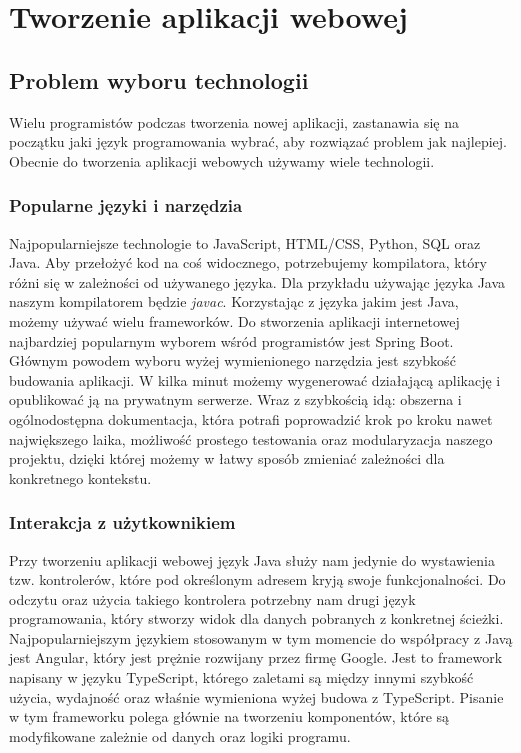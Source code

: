 \chapter{Tworzenie aplikacji webowej}

\section{Problem wyboru technologii}

Wielu programistów podczas tworzenia nowej aplikacji, zastanawia się na początku jaki język programowania wybrać, aby rozwiązać problem jak najlepiej. Obecnie do tworzenia aplikacji webowych używamy wiele technologii.

\subsection{Popularne języki i narzędzia}

Najpopularniejsze technologie to JavaScript, HTML/CSS, Python, SQL oraz Java. Aby przełożyć kod na coś widocznego, potrzebujemy kompilatora, który różni się w zależności od używanego języka. Dla przykładu używając języka Java naszym kompilatorem będzie \textit{javac}. Korzystając z języka jakim jest Java, możemy używać wielu frameworków. Do stworzenia aplikacji internetowej najbardziej popularnym wyborem wśród programistów jest Spring Boot. Głównym powodem wyboru wyżej wymienionego narzędzia jest szybkość budowania aplikacji. W kilka minut możemy wygenerować działającą aplikację i opublikować ją na prywatnym serwerze. Wraz z szybkością idą: obszerna i ogólnodostępna dokumentacja, która potrafi poprowadzić krok po kroku nawet największego laika, możliwość prostego testowania oraz modularyzacja naszego projektu, dzięki której możemy w łatwy sposób zmieniać zależności dla konkretnego kontekstu.

\subsection{Interakcja z użytkownikiem}

Przy tworzeniu aplikacji webowej język Java służy nam jedynie do wystawienia tzw. kontrolerów, które pod określonym adresem kryją swoje funkcjonalności. Do odczytu oraz użycia takiego kontrolera potrzebny nam drugi język programowania, który stworzy widok dla danych pobranych z konkretnej ścieżki. Najpopularniejszym językiem stosowanym w tym momencie do współpracy z Javą jest Angular, który jest prężnie rozwijany przez firmę Google. Jest to framework napisany w języku TypeScript, którego zaletami są między innymi szybkość użycia, wydajność oraz właśnie wymieniona wyżej budowa z TypeScript. Pisanie w tym frameworku polega głównie na tworzeniu komponentów, które są modyfikowane zależnie od danych oraz logiki programu.

